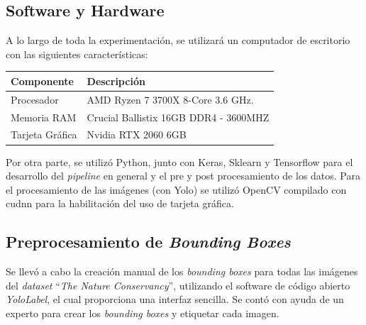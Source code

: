 \subsection{Software y Hardware}
A lo largo de toda la experimentación, se utilizará un computador de escritorio con las siguientes características:

\begin{table}[h!]
\centering
\footnotesize
\begin{tabular}{|l|l|}
\hline
\textbf{Componente} & \textbf{Descripción} \\ \hline
Procesador & AMD Ryzen 7 3700X 8-Core 3.6 GHz. \\ \hline
Memoria RAM & Crucial Ballistix 16GB DDR4 - 3600MHZ \\ \hline
Tarjeta Gráfica & Nvidia RTX 2060 6GB \\ \hline
\end{tabular}
\end{table}

Por otra parte, se utilizó Python, junto con Keras, Sklearn y Tensorflow 
para el desarrollo del \textit{pipeline} en general y el pre y post 
procesamiento de los datos. Para el procesamiento de las imágenes (con Yolo) 
se utilizó OpenCV compilado con cudnn para la habilitación del uso de tarjeta gráfica. 

\subsection{Preprocesamiento de \textit{Bounding Boxes}}

Se llevó a cabo la creación manual de los \textit{bounding boxes} para todas las 
imágenes del \textit{dataset} ``\textit{The Nature Conservancy}'', utilizando el 
software de código abierto \textit{YoloLabel}, el cual proporciona una interfaz 
sencilla. Se contó con ayuda de un experto para crear los \textit{bounding boxes} 
y etiquetar cada imagen.
\\

